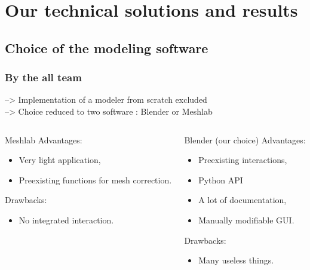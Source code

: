 \documentclass{beamer}
\begin{document}
\section{Our technical solutions and results}

\subsection{Choice of the modeling software}
\begin{frame}
	\frametitle{By the all team}
		--> Implementation of a modeler from scratch excluded \\
		--> Choice reduced to two software : Blender or Meshlab
    \begin{columns}[t]
  	\begin{column}{5cm}
  		\begin{block}{Meshlab}
  		Advantages:
  		\begin{itemize}
  		\item Very light application,
  		\item Preexisting functions for mesh correction.
  		\end{itemize}
  		
  		Drawbacks:
  		\begin{itemize}
  		\item No integrated interaction.
  		\end{itemize}
 	 	\end{block}   
  	\end{column}
  
  	\begin{column}{5cm}
  		\begin{block}{Blender (our choice)}
  		Advantages:
  		\begin{itemize}
  		\item Preexisting interactions,
  		\item Python API  
  		\item A lot of documentation,
  		\item Manually modifiable GUI.
  		\end{itemize}
  		
  		Drawbacks:
  		\begin{itemize}
  		\item Many useless things.
  		\end{itemize}
 	 	\end{block}   
  	\end{column}
 	\end{columns}  
    
\end{frame}
\end{document}
